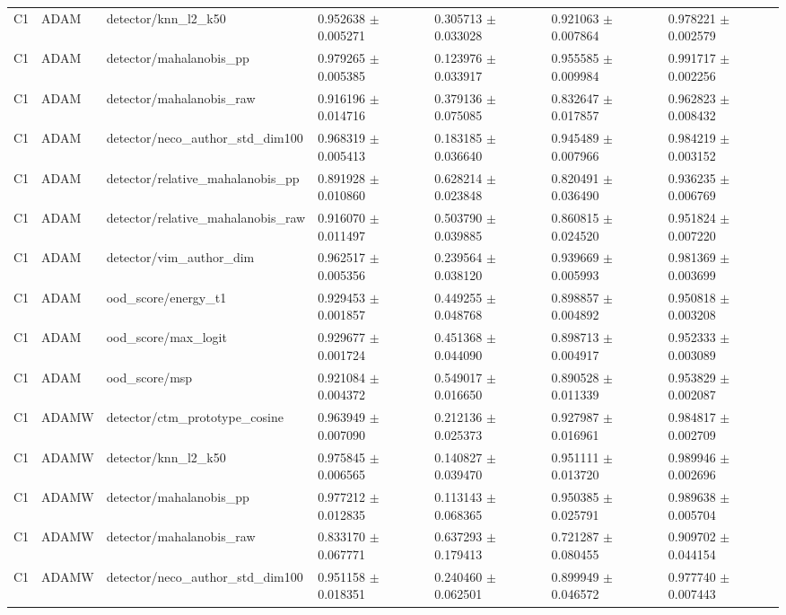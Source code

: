\begin{longtable}{lllllll}
C1 & ADAM & detector/knn\_l2\_k50 & 0.952638 $\pm$ 0.005271 & 0.305713 $\pm$ 0.033028 & 0.921063 $\pm$ 0.007864 & 0.978221 $\pm$ 0.002579 \\
C1 & ADAM & detector/mahalanobis\_pp & 0.979265 $\pm$ 0.005385 & 0.123976 $\pm$ 0.033917 & 0.955585 $\pm$ 0.009984 & 0.991717 $\pm$ 0.002256 \\
C1 & ADAM & detector/mahalanobis\_raw & 0.916196 $\pm$ 0.014716 & 0.379136 $\pm$ 0.075085 & 0.832647 $\pm$ 0.017857 & 0.962823 $\pm$ 0.008432 \\
C1 & ADAM & detector/neco\_author\_std\_dim100 & 0.968319 $\pm$ 0.005413 & 0.183185 $\pm$ 0.036640 & 0.945489 $\pm$ 0.007966 & 0.984219 $\pm$ 0.003152 \\
C1 & ADAM & detector/relative\_mahalanobis\_pp & 0.891928 $\pm$ 0.010860 & 0.628214 $\pm$ 0.023848 & 0.820491 $\pm$ 0.036490 & 0.936235 $\pm$ 0.006769 \\
C1 & ADAM & detector/relative\_mahalanobis\_raw & 0.916070 $\pm$ 0.011497 & 0.503790 $\pm$ 0.039885 & 0.860815 $\pm$ 0.024520 & 0.951824 $\pm$ 0.007220 \\
C1 & ADAM & detector/vim\_author\_dim & 0.962517 $\pm$ 0.005356 & 0.239564 $\pm$ 0.038120 & 0.939669 $\pm$ 0.005993 & 0.981369 $\pm$ 0.003699 \\
C1 & ADAM & ood\_score/energy\_t1 & 0.929453 $\pm$ 0.001857 & 0.449255 $\pm$ 0.048768 & 0.898857 $\pm$ 0.004892 & 0.950818 $\pm$ 0.003208 \\
C1 & ADAM & ood\_score/max\_logit & 0.929677 $\pm$ 0.001724 & 0.451368 $\pm$ 0.044090 & 0.898713 $\pm$ 0.004917 & 0.952333 $\pm$ 0.003089 \\
C1 & ADAM & ood\_score/msp & 0.921084 $\pm$ 0.004372 & 0.549017 $\pm$ 0.016650 & 0.890528 $\pm$ 0.011339 & 0.953829 $\pm$ 0.002087 \\
C1 & ADAMW & detector/ctm\_prototype\_cosine & 0.963949 $\pm$ 0.007090 & 0.212136 $\pm$ 0.025373 & 0.927987 $\pm$ 0.016961 & 0.984817 $\pm$ 0.002709 \\
C1 & ADAMW & detector/knn\_l2\_k50 & 0.975845 $\pm$ 0.006565 & 0.140827 $\pm$ 0.039470 & 0.951111 $\pm$ 0.013720 & 0.989946 $\pm$ 0.002696 \\
C1 & ADAMW & detector/mahalanobis\_pp & 0.977212 $\pm$ 0.012835 & 0.113143 $\pm$ 0.068365 & 0.950385 $\pm$ 0.025791 & 0.989638 $\pm$ 0.005704 \\
C1 & ADAMW & detector/mahalanobis\_raw & 0.833170 $\pm$ 0.067771 & 0.637293 $\pm$ 0.179413 & 0.721287 $\pm$ 0.080455 & 0.909702 $\pm$ 0.044154 \\
C1 & ADAMW & detector/neco\_author\_std\_dim100 & 0.951158 $\pm$ 0.018351 & 0.240460 $\pm$ 0.062501 & 0.899949 $\pm$ 0.046572 & 0.977740 $\pm$ 0.007443 \\

\end{longtable}
